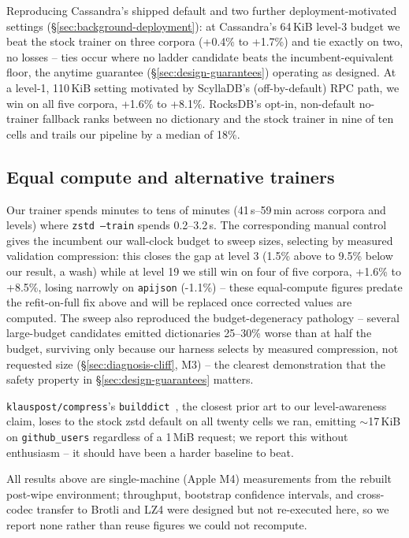 \documentclass[12pt]{article}
\newcommand{\pending}[1]{#1}
\begin{document}


Reproducing Cassandra's shipped default and two further
deployment-motivated settings (\S\ref{sec:background-deployment}): at
Cassandra's 64\,KiB level-3 budget we beat the stock trainer on three
corpora (+0.4\% to +1.7\%) and tie exactly on two, no losses -- ties
occur where no ladder candidate beats the incumbent-equivalent floor,
the anytime guarantee (\S\ref{sec:design-guarantees}) operating as
designed. At a level-1, 110\,KiB setting motivated by ScyllaDB's
(off-by-default) RPC path, we win on all five corpora, +1.6\% to
+8.1\%. RocksDB's opt-in, non-default no-trainer fallback ranks between
no dictionary and the stock trainer in nine of ten cells and trails our
pipeline by a median of 18\%.

\subsection{Equal compute and alternative trainers}
\label{sec:results-equalcompute}

Our trainer spends minutes to tens of minutes (41\,s--59\,min across
corpora and levels) where \texttt{zstd --train} spends 0.2--3.2\,s. The
corresponding manual control gives the
incumbent our wall-clock budget to sweep sizes, selecting by measured
validation compression: this closes the gap at level 3
(\pending{1.5\%} above to \pending{9.5\%} below our result, a wash)
while at level 19 we still win on \pending{four of five} corpora,
\pending{+1.6\%} to \pending{+8.5\%}, losing narrowly on
\texttt{apijson} (\pending{-1.1\%}) -- these equal-compute figures
predate the refit-on-full fix above and will be replaced once corrected
values are computed. The sweep also reproduced the budget-degeneracy
pathology -- several large-budget candidates emitted dictionaries
25--30\% worse than at half the budget, surviving only because our
harness selects by measured compression, not requested size
(\S\ref{sec:diagnosis-cliff}, M3) -- the clearest demonstration that the
safety property in \S\ref{sec:design-guarantees} matters.

\texttt{klauspost/compress}'s \texttt{builddict}~\cite{klauspost}, the
closest prior art to our level-awareness claim, loses to the stock zstd
default on all twenty cells we ran, emitting $\sim$17\,KiB on
\texttt{github\_users} regardless of a 1\,MiB request; we report this
without enthusiasm -- it should have been a harder baseline to beat.

All results above are single-machine (Apple M4) measurements from the
rebuilt post-wipe environment; throughput, bootstrap confidence
intervals, and cross-codec transfer to Brotli and LZ4 were designed but
not re-executed here, so we report none rather than reuse figures we
could not recompute.
\end{document}
